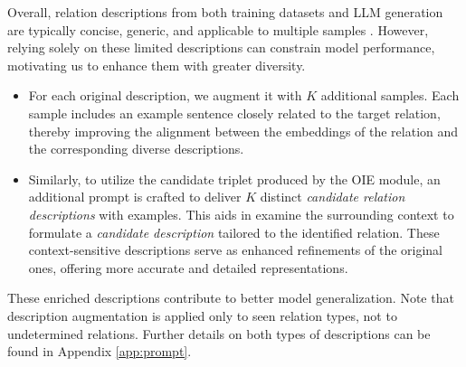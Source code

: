 Overall, relation descriptions from both training datasets and LLM generation are typically concise, generic, and applicable to multiple samples \citep{han-etal-2018-fewrel, zhang-etal-2017-position}. However, relying solely on these limited descriptions can constrain model performance, motivating us to enhance them with greater diversity.
\begin{itemize}
    \item For each original description, we augment it with $K$ additional samples. Each sample includes an example sentence closely related to the target relation, thereby improving the alignment between the embeddings of the relation and the corresponding diverse descriptions.

 \item Similarly, to utilize the candidate triplet produced by the OIE module, an additional prompt is crafted to deliver $K$ distinct \textit{candidate relation descriptions} with examples. This aids in examine the surrounding context to formulate a \textit{candidate description} tailored to the identified relation. These context-sensitive descriptions serve as enhanced refinements of the original ones, offering more accurate and detailed representations.
\end{itemize}


 These enriched descriptions contribute to better model generalization. Note that description augmentation is applied only to seen relation types, not to undetermined relations. Further details on both types of descriptions can be found in Appendix \ref{app:prompt}.



